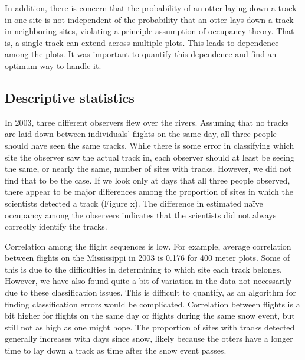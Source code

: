 \documentclass[12pt]{article}
\begin{document}
In addition, there is concern that the probability of an otter laying down a 
track in one site is not independent of the probability that an otter lays down 
a track in neighboring sites, violating a principle assumption of occupancy 
theory. That is, a single track can extend across multiple plots. This leads to 
dependence among the plots. It was important to quantify this dependence and 
find an optimum way to handle it.

\subsection{Descriptive statistics}

In 2003, three different observers flew over the rivers. Assuming that no tracks 
are laid down between individuals' flights on the same day, all three people 
should have seen the same tracks. While there is some error in classifying which 
site the observer saw the actual track in, each observer should at least be 
seeing the same, or nearly the same, number of sites with tracks. However, we 
did not find that to be the case. If we look only at days that all three people 
observed, there appear to be major differences among the proportion of sites in 
which the scientists detected a track (Figure x). The difference in estimated 
na\"ive occupancy among the observers indicates that the scientists did not 
always correctly identify the tracks. 

Correlation among the flight sequences is low. For example, average correlation 
between flights on the Mississippi in 2003 is 0.176 for 400 meter plots. Some of 
this is due to the difficulties in determining to which site each track belongs. 
However, we have also found quite a bit of variation in the data not necessarily 
due to these classification issues. This is difficult to quantify, as an 
algorithm for finding classification errors would be complicated. Correlation 
between flights is a bit higher for flights on the same day or flights during 
the same snow event, but still not as high as one might hope. The proportion of 
sites with tracks detected generally increases with days since snow, likely 
because the otters have a longer time to lay down a track as time after the snow 
event passes.
\end{document}
